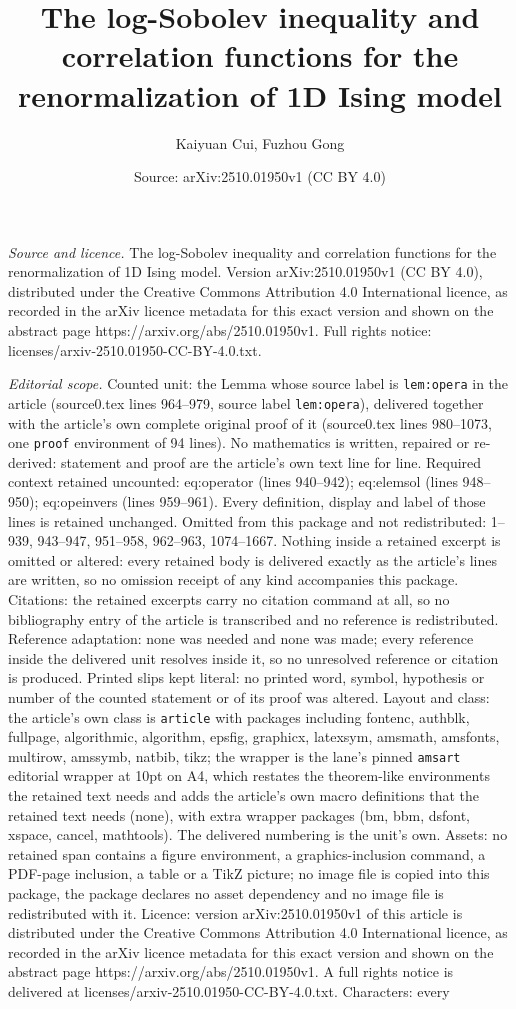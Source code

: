\documentclass[10pt,a4paper]{amsart}
\title[The log-Sobolev inequality and correlation functions for the]{The log-Sobolev inequality and correlation functions for the renormalization of 1D Ising model}
\author{Kaiyuan Cui, Fuzhou Gong}
\date{Source: arXiv:2510.01950v1 (CC BY 4.0)}
\begin{document}
\maketitle

\noindent\emph{Source and licence.} The log-Sobolev inequality and correlation functions for the renormalization of 1D Ising model. Version arXiv:2510.01950v1 (CC BY 4.0), distributed under the Creative Commons Attribution 4.0 International licence, as recorded in the arXiv licence metadata for this exact version and shown on the abstract page https://arxiv.org/abs/2510.01950v1. Full rights notice: licenses/arxiv-2510.01950-CC-BY-4.0.txt.\par\smallskip

\noindent\textit{Editorial scope.} Counted unit: the Lemma whose source label is \texttt{lem:opera} in the article (source0.tex lines 964--979, source label \texttt{lem:opera}), delivered together with the article's own complete original proof of it (source0.tex lines 980--1073, one \texttt{proof} environment of 94 lines). No mathematics is written, repaired or re-derived: statement and proof are the article's own text line for line. Required context retained uncounted: eq:operator (lines 940--942); eq:elemsol (lines 948--950); eq:opeinvers (lines 959--961). Every definition, display and label of those lines is retained unchanged. Omitted from this package and not redistributed: 1--939, 943--947, 951--958, 962--963, 1074--1667. Nothing inside a retained excerpt is omitted or altered: every retained body is delivered exactly as the article's lines are written, so no omission receipt of any kind accompanies this package. Citations: the retained excerpts carry no citation command at all, so no bibliography entry of the article is transcribed and no reference is redistributed. Reference adaptation: none was needed and none was made; every reference inside the delivered unit resolves inside it, so no unresolved reference or citation is produced. Printed slips kept literal: no printed word, symbol, hypothesis or number of the counted statement or of its proof was altered. Layout and class: the article's own class is \texttt{article} with packages including fontenc, authblk, fullpage, algorithmic, algorithm, epsfig, graphicx, latexsym, amsmath, amsfonts, multirow, amssymb, natbib, tikz; the wrapper is the lane's pinned \texttt{amsart} editorial wrapper at 10pt on A4, which restates the theorem-like environments the retained text needs and adds the article's own macro definitions that the retained text needs (none), with extra wrapper packages (bm, bbm, dsfont, xspace, cancel, mathtools). The delivered numbering is the unit's own. Assets: no retained span contains a figure environment, a graphics-inclusion command, a PDF-page inclusion, a table or a TikZ picture; no image file is copied into this package, the package declares no asset dependency and no image file is redistributed with it. Licence: version arXiv:2510.01950v1 of this article is distributed under the Creative Commons Attribution 4.0 International licence, as recorded in the arXiv licence metadata for this exact version and shown on the abstract page https://arxiv.org/abs/2510.01950v1. A full rights notice is delivered at licenses/arxiv-2510.01950-CC-BY-4.0.txt. Characters: every 
\end{document}
